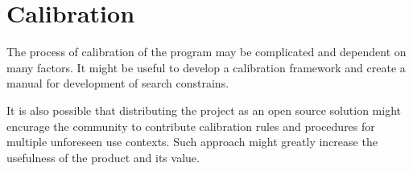 \documentclass[a4paper,twoside,12pt]{book}
\newcounter{PagesWithoutNumbers}
\begin{document}
\section{Calibration}

The process of calibration of the program may be complicated and dependent on many factors. It might be 
useful to develop a calibration framework and create a manual for development of search constrains. 

It is also possible that distributing the project as an open source solution might encurage the community to
contribute calibration rules and procedures for multiple unforeseen use contexts. Such approach might greatly 
increase the usefulness of the product and its value.
 


\backmatter
{}
\setcounter{page}{\value{PagesWithoutNumbers}}

\pagestyle{onlyPageNumbers}




\end{document}
